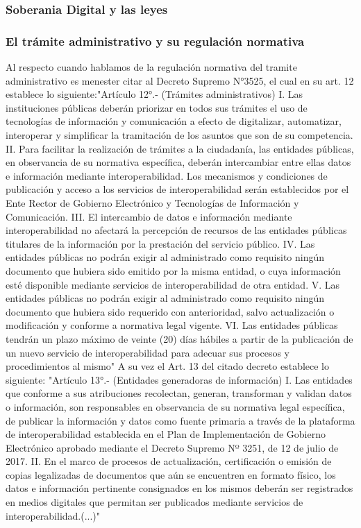 \subsubsection{Soberania Digital y las leyes}
\subsubsection{El trámite administrativo y su regulación normativa}
Al respecto cuando hablamos de la regulación normativa del tramite administrativo es menester citar al Decreto Supremo N°3525, el cual en su art. 12 establece lo siguiente:"Artículo 12°.- (Trámites administrativos) I. Las instituciones públicas deberán priorizar en todos sus trámites el uso de tecnologías de información y comunicación a efecto de digitalizar, automatizar, interoperar y simplificar la tramitación de los asuntos que son de su competencia. II. Para facilitar la realización de trámites a la ciudadanía, las entidades públicas, en observancia de su normativa específica, deberán intercambiar entre ellas datos e información mediante interoperabilidad. Los mecanismos y condiciones de publicación y acceso a los servicios de interoperabilidad serán establecidos por el Ente Rector de Gobierno Electrónico y Tecnologías de Información y Comunicación. III. El intercambio de datos e información mediante interoperabilidad no afectará la percepción de recursos de las entidades públicas titulares de la información por la prestación del servicio público. IV. Las entidades públicas no podrán exigir al administrado como requisito ningún documento que hubiera sido emitido por la misma entidad, o cuya información esté disponible mediante servicios de interoperabilidad de otra entidad. V. Las entidades públicas no podrán exigir al administrado como requisito ningún documento que hubiera sido requerido con anterioridad, salvo actualización o modificación y conforme a normativa legal vigente. VI. Las entidades públicas tendrán un plazo máximo de veinte (20) días hábiles a partir de la publicación de un nuevo servicio de interoperabilidad para adecuar sus procesos y procedimientos al mismo" A su vez el Art. 13 del citado decreto establece lo siguiente: "Artículo 13°.- (Entidades generadoras de información) I. Las entidades que conforme a sus atribuciones recolectan, generan, transforman y validan datos o información, son responsables en observancia de su normativa legal específica, de publicar la información y datos como fuente primaria a través de la plataforma de interoperabilidad establecida en el Plan de Implementación de Gobierno Electrónico aprobado mediante el Decreto Supremo Nº 3251, de 12 de julio de 2017. II. En el marco de procesos de actualización, certificación o emisión de copias legalizadas de documentos que aún se encuentren en formato físico, los datos e información pertinente consignados en los mismos deberán ser registrados en medios digitales que permitan ser publicados mediante servicios de interoperabilidad.(...)"
